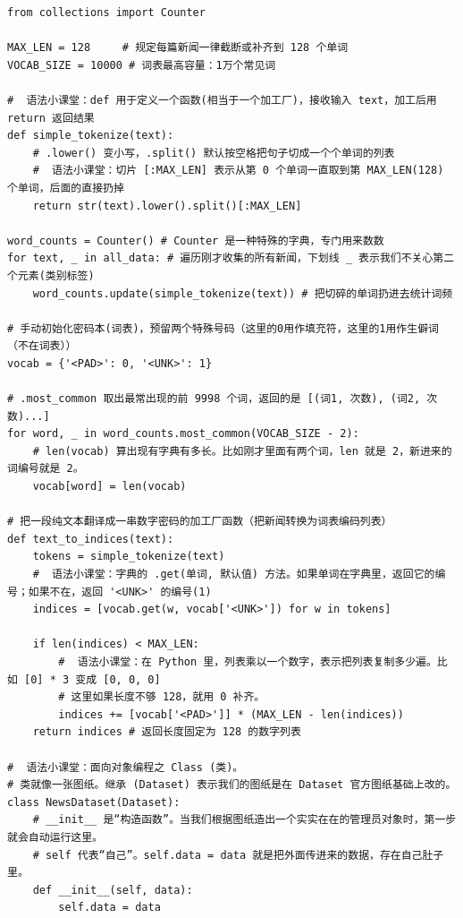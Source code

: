 \documentclass[10pt]{article}
\numberwithin{equation}{section}
\theoremstyle{plain}
\theoremstyle{definition}
\theoremstyle{remark}
\begin{document}
\begin{CodeBox}
	\begin{lstlisting}[style=PythonStyle]
from collections import Counter

MAX_LEN = 128     # 规定每篇新闻一律截断或补齐到 128 个单词
VOCAB_SIZE = 10000 # 词表最高容量：1万个常见词

#  语法小课堂：def 用于定义一个函数(相当于一个加工厂)，接收输入 text，加工后用 return 返回结果
def simple_tokenize(text):
    # .lower() 变小写，.split() 默认按空格把句子切成一个个单词的列表
    #  语法小课堂：切片 [:MAX_LEN] 表示从第 0 个单词一直取到第 MAX_LEN(128) 个单词，后面的直接扔掉
    return str(text).lower().split()[:MAX_LEN]

word_counts = Counter() # Counter 是一种特殊的字典，专门用来数数
for text, _ in all_data: # 遍历刚才收集的所有新闻，下划线 _ 表示我们不关心第二个元素(类别标签)
    word_counts.update(simple_tokenize(text)) # 把切碎的单词扔进去统计词频

# 手动初始化密码本(词表)，预留两个特殊号码（这里的0用作填充符，这里的1用作生僻词（不在词表））
vocab = {'<PAD>': 0, '<UNK>': 1}

# .most_common 取出最常出现的前 9998 个词，返回的是 [(词1, 次数), (词2, 次数)...]
for word, _ in word_counts.most_common(VOCAB_SIZE - 2):
    # len(vocab) 算出现有字典有多长。比如刚才里面有两个词，len 就是 2，新进来的词编号就是 2。
    vocab[word] = len(vocab)

# 把一段纯文本翻译成一串数字密码的加工厂函数（把新闻转换为词表编码列表）
def text_to_indices(text):
    tokens = simple_tokenize(text)
    #  语法小课堂：字典的 .get(单词, 默认值) 方法。如果单词在字典里，返回它的编号；如果不在，返回 '<UNK>' 的编号(1)
    indices = [vocab.get(w, vocab['<UNK>']) for w in tokens]
    
    if len(indices) < MAX_LEN:
        #  语法小课堂：在 Python 里，列表乘以一个数字，表示把列表复制多少遍。比如 [0] * 3 变成 [0, 0, 0]
        # 这里如果长度不够 128，就用 0 补齐。
        indices += [vocab['<PAD>']] * (MAX_LEN - len(indices))
    return indices # 返回长度固定为 128 的数字列表

#  语法小课堂：面向对象编程之 Class (类)。
# 类就像一张图纸。继承 (Dataset) 表示我们的图纸是在 Dataset 官方图纸基础上改的。
class NewsDataset(Dataset):
    # __init__ 是“构造函数”。当我们根据图纸造出一个实实在在的管理员对象时，第一步就会自动运行这里。
    # self 代表“自己”。self.data = data 就是把外面传进来的数据，存在自己肚子里。
    def __init__(self, data):
        self.data = data
        

\end{lstlisting}
\end{CodeBox}
\end{document}
